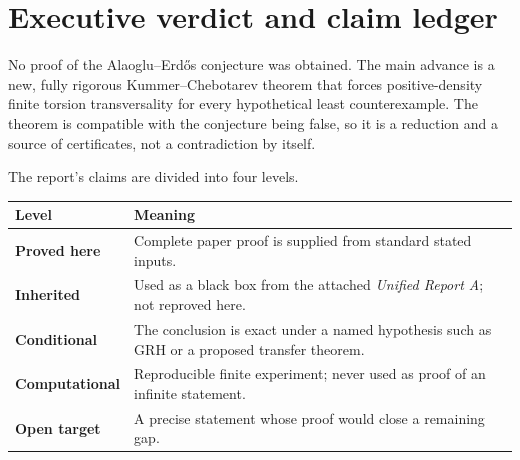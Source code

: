 \documentclass[11pt]{article}
\numberwithin{equation}{section}
\theoremstyle{definition}
\theoremstyle{remark}
\newcommand{\ReportA}{\textit{Unified Report A}}
\begin{document}
\begingroup
\small
\tableofcontents
\endgroup
\newpage

\section{Executive verdict and claim ledger}

\begin{statusbox}
No proof of the Alaoglu--Erd\H{o}s conjecture was obtained.  The main advance is a new,
fully rigorous Kummer--Chebotarev theorem that forces positive-density finite torsion
transversality for every hypothetical least counterexample.  The theorem is compatible with
the conjecture being false, so it is a reduction and a source of certificates, not a
contradiction by itself.
\end{statusbox}

The report's claims are divided into four levels.

\begin{center}
\begin{tabularx}{0.96\textwidth}{@{}>{\bfseries}p{}X@{}}
\toprule
Level & Meaning \\
\midrule
Proved here & Complete paper proof is supplied from standard stated inputs. \\
Inherited & Used as a black box from the attached \ReportA; not reproved here. \\
Conditional & The conclusion is exact under a named hypothesis such as GRH or a proposed transfer theorem. \\
Computational & Reproducible finite experiment; never used as proof of an infinite statement. \\
Open target & A precise statement whose proof would close a remaining gap. \\
\bottomrule
\end{tabularx}
\end{center}
\end{document}
